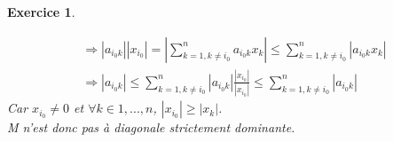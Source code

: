 \documentclass[a4paper,11pt]{article}
\newtheorem{exo}{Exercice}
\newcommand{\abs}[1]{\left\lvert#1\right\rvert}
\begin{document}
\begin{exo}
\begin{enumerate}
\begin{equation}
\begin{aligned}
& \Rightarrow \abs{a_{i_0k}}\abs{x_{i_0}} = \abs{\sum\limits_{k=1,k\neq i_0}^n a_{i_0k}x_k} \le \sum\limits_{k=1,k\neq i_0}^n \abs{a_{i_0k}x_k} \ \\
& \Rightarrow \abs{a_{i_0k}} \le \sum\limits_{k=1,k\neq i_0}^n \abs{a_{i_0k}}\frac{\abs{x_i_0}}{\abs{x_{i_0}}}  \le \sum\limits_{k=1,k\neq i_0}^n \abs{a_{i_0k}}
\end{aligned}
\end{equation}
Car $x_{i_0} \ne 0 $ et  $\forall k \in 1,...,n$, $\abs{x_{i_0}} \ge \abs{x_k}$. \ \\
{\it M} n'est donc pas à diagonale strictement dominante.
\end{enumerate}
\end{exo}

\end{document}
